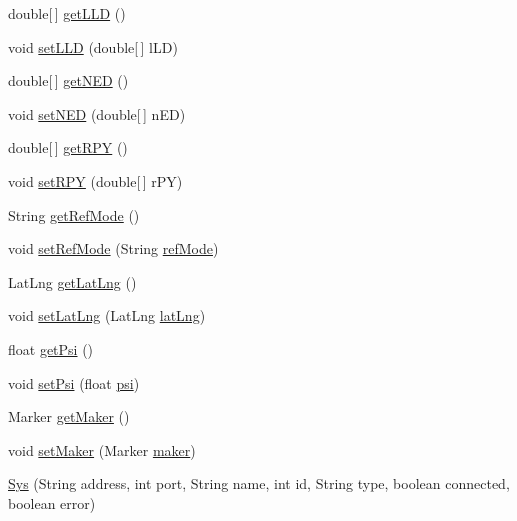 \begin{DoxyCompactItemize}
\item 
double\mbox{[}$\,$\mbox{]} \hyperlink{classpt_1_1lsts_1_1asa_1_1sys_1_1Sys_a13d0f8ba8a76651668e6adc0ba67634c}{get\+L\+L\+D} ()
\item 
void \hyperlink{classpt_1_1lsts_1_1asa_1_1sys_1_1Sys_ab1311d9e9bbe3473af4975f3629d5c0c}{set\+L\+L\+D} (double\mbox{[}$\,$\mbox{]} l\+L\+D)
\item 
double\mbox{[}$\,$\mbox{]} \hyperlink{classpt_1_1lsts_1_1asa_1_1sys_1_1Sys_a8462c98894f36b1591e49cf8c7dfb397}{get\+N\+E\+D} ()
\item 
void \hyperlink{classpt_1_1lsts_1_1asa_1_1sys_1_1Sys_a4a9d4bec8dc5cabd41c6463edb9ea72f}{set\+N\+E\+D} (double\mbox{[}$\,$\mbox{]} n\+E\+D)
\item 
double\mbox{[}$\,$\mbox{]} \hyperlink{classpt_1_1lsts_1_1asa_1_1sys_1_1Sys_a528c6aef39df450240d4d24ea45f915b}{get\+R\+P\+Y} ()
\item 
void \hyperlink{classpt_1_1lsts_1_1asa_1_1sys_1_1Sys_a5c7f24a047797189c03488e0a8c68014}{set\+R\+P\+Y} (double\mbox{[}$\,$\mbox{]} r\+P\+Y)
\item 
String \hyperlink{classpt_1_1lsts_1_1asa_1_1sys_1_1Sys_acf4262f0285ace3ddb3b77f5c8ae4f96}{get\+Ref\+Mode} ()
\item 
void \hyperlink{classpt_1_1lsts_1_1asa_1_1sys_1_1Sys_aba75b354b0ee9a3149fc4d3baab27e50}{set\+Ref\+Mode} (String \hyperlink{classpt_1_1lsts_1_1asa_1_1sys_1_1Sys_aefcbaa46921015c924311d0a2d3dbbe0}{ref\+Mode})
\item 
Lat\+Lng \hyperlink{classpt_1_1lsts_1_1asa_1_1sys_1_1Sys_aa26833f550f2a0762b2b1b7541a8df2a}{get\+Lat\+Lng} ()
\item 
void \hyperlink{classpt_1_1lsts_1_1asa_1_1sys_1_1Sys_a902a68da2d855284165727dbc2c2ac64}{set\+Lat\+Lng} (Lat\+Lng \hyperlink{classpt_1_1lsts_1_1asa_1_1sys_1_1Sys_af1aaba346d090fae8aabf5c809245fd2}{lat\+Lng})
\item 
float \hyperlink{classpt_1_1lsts_1_1asa_1_1sys_1_1Sys_a89a2ade426daa74e2e5d7e3b6037a00d}{get\+Psi} ()
\item 
void \hyperlink{classpt_1_1lsts_1_1asa_1_1sys_1_1Sys_a5a1e69839b4c6e0272657f8e2f8c0134}{set\+Psi} (float \hyperlink{classpt_1_1lsts_1_1asa_1_1sys_1_1Sys_a23d5b791a79a3e5b8863d35ee9dd21c7}{psi})
\item 
Marker \hyperlink{classpt_1_1lsts_1_1asa_1_1sys_1_1Sys_a36a33b3c486f62c21bfbc0e886910ae2}{get\+Maker} ()
\item 
void \hyperlink{classpt_1_1lsts_1_1asa_1_1sys_1_1Sys_a88dfe7d5dced05d6b76631176d4620a2}{set\+Maker} (Marker \hyperlink{classpt_1_1lsts_1_1asa_1_1sys_1_1Sys_adae0c402ab1bf93eef2e5cd7b7acafe4}{maker})
\item 
\hyperlink{classpt_1_1lsts_1_1asa_1_1sys_1_1Sys_a1e3b790a9ee0e1dc52d89c47e4bc14e2}{Sys} (String address, int port, String name, int id, String type, boolean connected, boolean error)
\end{DoxyCompactItemize}
